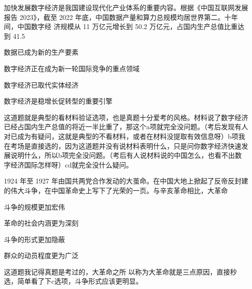 \documentclass[lang=cn,newtx,10pt,scheme=chinese,pad,twocol]{zznote}
\begin{document}
\begin{exercise}加快发展数字经济是我国建设现代化产业体系的重要内容。根据《中国互联网发展报告 2023》，截至 2022 年底，中国数据产量和算力总规模均居世界第二。十年间，中国数字经 济规模从 11 万亿元增长到 50.2 万亿元，占国内生产总值比重达到 41.5%
	\begin{choice}
		\item 数据已成为新的生产要素
		\item 数字经济正在成为新一轮国际竞争的重点领域
		\item 数字经济已取代实体经济
		\item 数字经济是稳增长促转型的重要引擎
	\end{choice}
\end{exercise}
\begin{solution}
	这道题就是典型的看材料验证选项，也是真题十分爱考的风格。材料说了数字经济已经占国内生产总值的将近一半比重了，那这个a项就完全没问题。（考后发现有人对已成为有疑问，这就是典型的不看材料，或者在材料没提取有效信息呀）b项我在考场是直接选的，因为这道题并没有说材料表明什么，只是问你数字经济快速发展说明什么，所以b项完全没问题。（考后有人说材料说的中国怎么，也看不出数字经济国际怎样呀）cd就完全没什么疑问。
\end{solution}


\begin{exercise}1924 年至 1927 年由国共两党合作发动的大茧命。在中国大地上掀起了反帝反封建 的伟大斗争，在中国革命史上写下了光荣的一页。与辛亥革命相比，大革命
	\begin{choice}
		\item 斗争的规模更加宏伟
		\item 革命的社会内涵更为深刻
		\item 斗争的形式更加隐蔽
		\item 群众的动员程度更为广泛
	\end{choice}
\end{exercise}
\begin{solution}
	这道题我记得真题是考过的，大革命之所 以称为大革命就是三点原因，直接秒选，简单看了下c选项，斗争形式应该更明显。

\end{solution}
\end{document}
